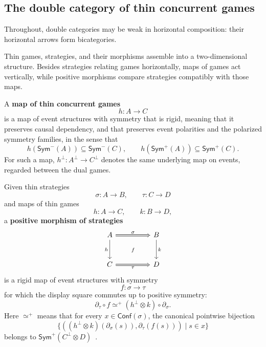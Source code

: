 \documentclass[oneside]{article}
\newcommand{\Conf}{\mathsf{Conf}}
\newcommand{\Sym}{\mathsf{Sym}}
\theoremstyle{plain}
\theoremstyle{definition}
\theoremstyle{remark}
\begin{document}
\subsection{The double category of thin concurrent games}
\label{subsec:cgqg-background-double-category}

Throughout, double categories may be weak in horizontal composition:
their horizontal arrows form bicategories.

Thin games, strategies, and their morphisms assemble into a two-dimensional structure. Besides strategies relating games horizontally, maps of games act vertically, while positive morphisms compare strategies compatibly with those maps.

A \textbf{map of thin concurrent games}
\[
    h:A\longrightarrow C
\]
is a map of event structures with symmetry that is rigid, meaning that it preserves causal dependency, and that preserves event polarities and the polarized symmetry families, in the sense that~\cite[\S5.3.1]{ClairambaultOlimpieriPaquet2025}
\[
    h(\Sym^-(A))\subseteq\Sym^-(C),
    \qquad
    h(\Sym^+(A))\subseteq\Sym^+(C).
\]
For such a map, \(h^\perp:A^\perp\to C^\perp\) denotes the same underlying map on events, regarded between the dual games.

Given thin strategies
\[
    \sigma:A\longrightarrow B,
    \qquad
    \tau:C\longrightarrow D
\]
and maps of thin games
\[
    h:A\longrightarrow C,
    \qquad
    k:B\longrightarrow D,
\]
a \textbf{positive morphism of strategies}
\[
    \begin{tikzcd}[column sep=huge,row sep=large]
        A \arrow[r,Rightarrow,"\sigma"] \arrow[d,"h"']
        & B \arrow[d,"k"] \\
        C \arrow[r,Rightarrow,"\tau"']
        & D
        \arrow[ul,Rightarrow,from=1-2,to=2-1,phantom,"\scriptstyle f"]
    \end{tikzcd}
\]
is a rigid map of event structures with symmetry
\[
    f:\sigma\longrightarrow\tau
\]
for which the display square commutes up to positive symmetry:
\[
    \partial_\tau\circ f
    \simeq^+
    (h^\perp\otimes k)\circ\partial_\sigma.
\]
Here \(\simeq^+\) means that for every \(x\in\Conf(\sigma)\), the canonical pointwise bijection
\[
    \bigl\{
        ((h^\perp\otimes k)(\partial_\sigma(s)),\partial_\tau(f(s)))
        \mid s\in x
    \bigr\}
\]
belongs to \(\Sym^+(C^\perp\otimes D)\)~\cite[Def.~5.8]{ClairambaultOlimpieriPaquet2025}.
\end{document}
